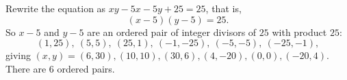 Rewrite the equation as $xy-5x-5y+25=25$, that is,
\[
(x-5)(y-5)=25 .
\]
So $x-5$ and $y-5$ are an ordered pair of integer divisors of $25$ with product $25$:
\[
(1,25),\ (5,5),\ (25,1),\ (-1,-25),\ (-5,-5),\ (-25,-1),
\]
giving $(x,y)=(6,30),(10,10),(30,6),(4,-20),(0,0),(-20,4)$. There are $\boxed{6}$ ordered pairs.
